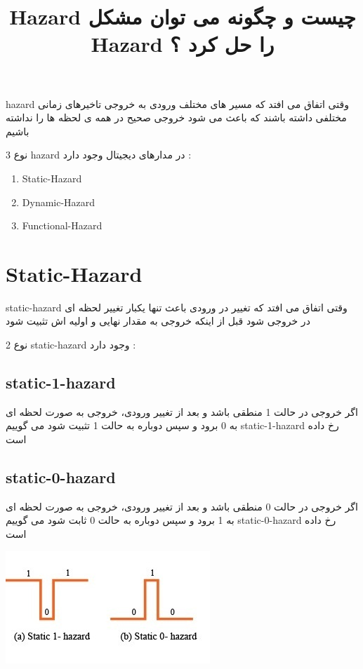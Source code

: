 \documentclass[12pt]{article}
\begin{document}
\title{\large Hazard چیست و چگونه می توان مشکل Hazard را حل کرد ؟}

\maketitle

\lstset{style=mystyle}

hazard وقتی اتفاق می افتد که مسیر های مختلف ورودی به خروجی تاخیرهای زمانی مختلفی داشته باشند که باعث می شود خروجی صحیح در همه ی لحظه ها را نداشته باشیم\newline

3 نوع hazard در مدارهای دیجیتال وجود دارد :

\begin{enumerate}
	\item Static-Hazard
	\item Dynamic-Hazard
	\item Functional-Hazard
\end{enumerate}


\section{Static-Hazard}

static-hazard وقتی اتفاق می افتد که تغییر در ورودی باعث تنها یکبار تغییر لحظه ای در خروجی شود قبل از اینکه خروجی به مقدار نهایی  و اولیه اش تثبیت شود\newline

2 نوع static-hazard وجود دارد :

\subsection{static-1-hazard}

اگر خروجی در حالت 1 منطقی باشد و بعد از تغییر ورودی، خروجی به صورت لحظه ای به 0 برود و سپس دوباره به حالت 1 تثبیت شود می گوییم
static-1-hazard
 رخ داده است


\subsection{static-0-hazard}

اگر خروجی در حالت 0 منطقی باشد و بعد از تغییر ورودی، خروجی به صورت لحظه ای به 1 برود و سپس دوباره به حالت 0 ثابت شود می گوییم static-0-hazard رخ داده است


\begin{center}
	\includegraphics[scale=0.8]{./Static-hazards-1.jpg}
\end{center}
\end{document}

